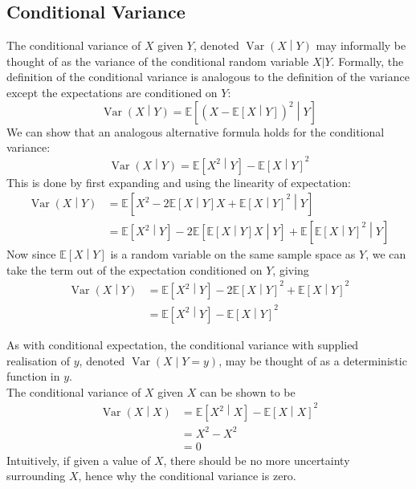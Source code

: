 \documentclass[11pt]{report} %
\begin{document}
\subsection{Conditional Variance}

The conditional variance of $X$ given $Y$, denoted $\operatorname{Var}\left(X\middle|Y\right)$ may informally be thought of as the variance of the conditional random variable $X|Y$. Formally, the definition of the conditional variance is analogous to the definition of the variance except the expectations are conditioned on $Y$:
\begin{equation}
\operatorname{Var}\left(X\middle|Y\right) = \mathbb{E}\left[\left(X - \mathbb{E}\left[X\middle|Y\right]\right)^{2}\middle| Y\right]
\end{equation}
We can show that an analogous alternative formula holds for the conditional variance:
\begin{equation}
\operatorname{Var}\left(X\middle|Y\right) = \mathbb{E}\left[X^{2}\middle|Y\right] - \mathbb{E}\left[X\middle| Y\right]^{2}
\end{equation}
This is done by first expanding and using the linearity of expectation:
\begin{align}
\operatorname{Var}\left(X\middle|Y\right) &= \mathbb{E}\left[X^{2} - 2\mathbb{E}\left[X\middle|Y\right]X + \mathbb{E}\left[X\middle|Y\right]^{2}\middle|Y\right] \\
&= \mathbb{E}\left[X^{2}\middle|Y\right] - 2\mathbb{E}\left[\mathbb{E}\left[X\middle|Y\right]X\middle|Y\right] + \mathbb{E}\left[\mathbb{E}\left[X\middle|Y\right]^{2}\middle|Y\right]
\end{align}
Now since $\mathbb{E}\left[X\middle|Y\right]$ is a random variable on the same sample space as $Y$, we can take the term out of the expectation conditioned on $Y$, giving
\begin{align}
\operatorname{Var}\left(X\middle|Y\right) &= \mathbb{E}\left[X^{2}\middle|Y\right] -2\mathbb{E}\left[X\middle| Y\right]^{2} + \mathbb{E}\left[X\middle| Y\right]^{2} \\
&= \mathbb{E}\left[X^{2}\middle|Y\right] - \mathbb{E}\left[X\middle| Y\right]^{2}
\end{align}

As with conditional expectation, the conditional variance with supplied realisation of $y$, denoted $\operatorname{Var}\left(X\middle|Y = y\right)$, may be thought of as a deterministic function in $y$. \\

The conditional variance of $X$ given $X$ can be shown to be
\begin{align}
\operatorname{Var}\left(X\middle|X\right) &= \mathbb{E}\left[X^{2}\middle|X\right] - \mathbb{E}\left[X\middle|X\right]^{2} \\
&= X^{2} - X^{2} \\
&= 0
\end{align}
Intuitively, if given a value of $X$, there should be no more uncertainty surrounding $X$, hence why the conditional variance is zero.
\end{document}
